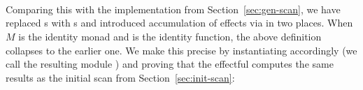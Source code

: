\begin{code}
\AgdaSymbol{)}\AgdaSpace{}%
\AgdaSymbol{(}\AgdaSpace{}%
\AgdaSymbol{))}\<%
\\
\>[.][@{}l@{}]\<[190I]%
\>[32]\AgdaSpace{}%
\AgdaOperator{\AgdaInductiveConstructor{,}}\AgdaSpace{}%
%
\>[40]\AgdaSpace{}%
\AgdaSpace{}%
\AgdaSpace{}%
\AgdaSpace{}%
\<%
\\
%
\>[32]%
\>[40]\AgdaSpace{}%
\AgdaSpace{}%
\AgdaOperator{\AgdaFunction{\$}}\AgdaSpace{}%
\AgdaSpace{}%
\AgdaOperator{\AgdaFunction{\$}}\AgdaSpace{}%
\AgdaSpace{}%
\AgdaSymbol{(}\AgdaSpace{}%
\AgdaSpace{}%
\AgdaSymbol{)}\AgdaSpace{}%
\AgdaSpace{}%
\<%
\\
%
\>[32]\AgdaSpace{}%
\AgdaSymbol{(}\AgdaSpace{}%
\AgdaOperator{\AgdaInductiveConstructor{,}}\AgdaSpace{}%
\AgdaSymbol{)}\<%
\end{code}
Comparing this with the implementation from Section~\ref{sec:gen-scan}, we
have replaced s with s and introduced accumulation of effects
via  in two places.  When $M$ is the identity monad and  is
the identity function, the above definition collapses to the earlier one.
We make this precise by instantiating  accordingly (we call the
resulting module ) and proving that the effectful  computes the
same results as the initial scan from Section~\ref{sec:init-scan}:
